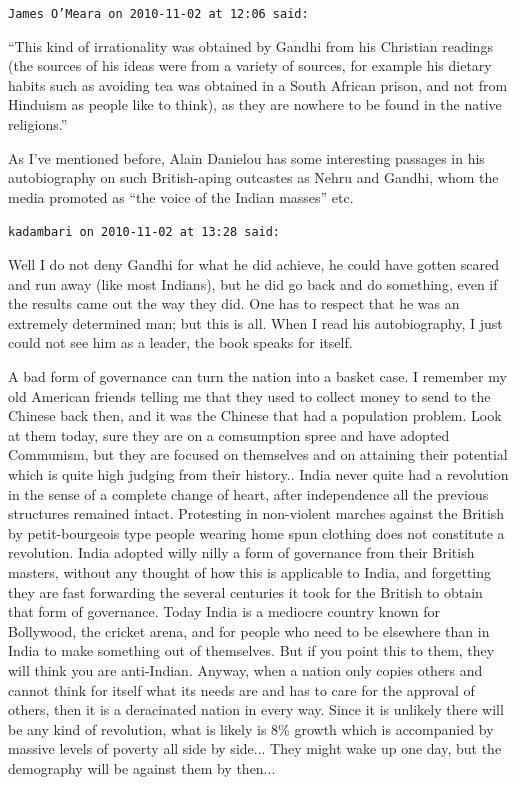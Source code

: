 \begin{footnotesize}
\begin{sffamily}
\hfill

\texttt{James O'Meara on 2010-11-02 at 12:06 said:}

``This kind of irrationality was obtained by Gandhi from his Christian readings (the sources of his ideas were from a variety of sources, for example his dietary habits such as avoiding tea was obtained in a South African prison, and not from Hinduism as people like to think), as they are nowhere to be found in the native religions.''

As I've mentioned before, Alain Danielou has some interesting passages in his autobiography on such British-aping outcastes as Nehru and Gandhi, whom the media promoted as ``the voice of the Indian masses'' etc.

\hfill

\texttt{kadambari on 2010-11-02 at 13:28 said:}

Well I do not deny Gandhi for what he did achieve, he could have gotten scared and run away (like most Indians), but he did go back and do something, even if the results came out the way they did. One has to respect that he was an extremely determined man; but this is all. When I read his autobiography, I just could not see him as a leader, the book speaks for itself.

A bad form of governance can turn the nation into a basket case. I remember my old American friends telling me that they used to collect money to send to the Chinese back then, and it was the Chinese that had a population problem. Look at them today, sure they are on a comsumption spree and have adopted Communism, but they are focused on themselves and on attaining their potential which is quite high judging from their history.. India never quite had a revolution in the sense of a complete change of heart, after independence all the previous structures remained intact. Protesting in non-violent marches against the British by petit-bourgeois type people wearing home spun clothing does not constitute a revolution. India adopted willy nilly a form of governance from their British masters, without any thought of how this is applicable to India, and forgetting they are fast forwarding the several centuries it took for the British to obtain that form of governance. Today India is a mediocre country known for Bollywood, the cricket arena, and for people who need to be elsewhere than in India to make something out of themselves. But if you point this to them, they will think you are anti-Indian. Anyway, when a nation only copies others and cannot think for itself what its needs are and has to care for the approval of others, then it is a deracinated nation in every way. Since it is unlikely there will be any kind of revolution, what is likely is 8\% growth which is accompanied by massive levels of poverty all side by side... They might wake up one day, but the demography will be against them by then... 


\end{sffamily}
\end{footnotesize}
